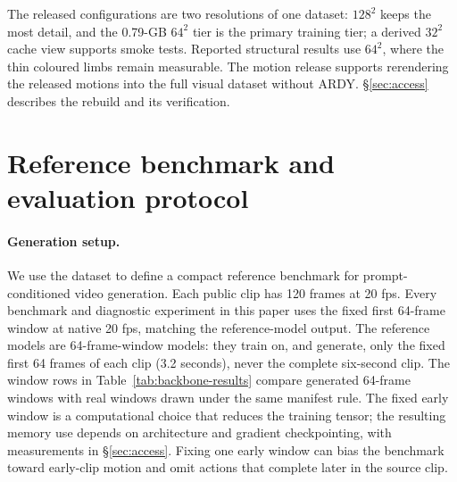 \documentclass[10pt,twocolumn]{article}
\begin{document}
The released configurations are two resolutions of one dataset: $128^2$ keeps the most detail, and the 0.79-GB
$64^2$ tier is the primary training tier; a derived $32^2$ cache view supports smoke tests. Reported structural
results use $64^2$, where the thin coloured limbs remain measurable. The motion release supports rerendering
the released motions into the full visual dataset without ARDY. \S\ref{sec:access} describes the rebuild
and its verification.

\section{Reference benchmark and evaluation protocol}
\paragraph{Generation setup.} We use the dataset to define a compact reference benchmark for
prompt-conditioned video generation. Each public clip has 120 frames at 20 fps. Every benchmark and
diagnostic experiment in this paper uses the fixed first 64-frame window at native 20 fps, matching the
reference-model output. The reference models are 64-frame-window models: they train on, and generate, only the fixed first 64
frames of each clip (3.2 seconds), never the complete six-second clip. The window rows in
Table~\ref{tab:backbone-results} compare generated 64-frame windows with real windows drawn under the same
manifest rule. The fixed early window is a computational choice that reduces the training tensor; the
resulting memory use depends on architecture and gradient checkpointing, with measurements in
\S\ref{sec:access}. Fixing one early window can bias the benchmark toward early-clip motion and omit
actions that complete later in the source clip.
\end{document}
